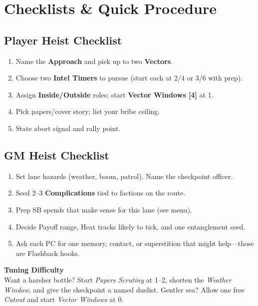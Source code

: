 \documentclass[11pt,oneside]{book}
\begin{document}
\section{Checklists \& Quick Procedure}

\subsection*{Player Heist Checklist}
\begin{enumerate}[leftmargin=*,itemsep=2pt]
  \item Name the \textbf{Approach} and pick up to two \textbf{Vectors}.
  \item Choose two \textbf{Intel Timers} to pursue (start each at 2/4 or 3/6 with prep).
  \item Assign \textbf{Inside/Outside} roles; start \textbf{Vector Windows [4]} at 1.
  \item Pick papers/cover story; list your bribe ceiling.
  \item State abort signal and rally point.
\end{enumerate}

\subsection*{GM Heist Checklist}
\begin{enumerate}[leftmargin=*,itemsep=2pt]
  \item Set lane hazards (weather, boom, patrol). Name the checkpoint officer.
  \item Seed 2--3 \textbf{Complications} tied to factions on the route.
  \item Prep SB spends that make sense for this lane (see menu).
  \item Decide Payoff range, Heat tracks likely to tick, and one entanglement seed.
  \item Ask each PC for one memory, contact, or superstition that might help---those are Flashback hooks.
\end{enumerate}

\begin{tcolorbox}[breakable]
\textbf{Tuning Difficulty}\\
Want a harsher bottle? Start \emph{Papers Scrutiny} at 1--2, shorten the \emph{Weather Window}, and give the checkpoint a named duelist. Gentler sea? Allow one free \emph{Cutout} and start \emph{Vector Windows} at 0.
\end{tcolorbox}
\end{document}
